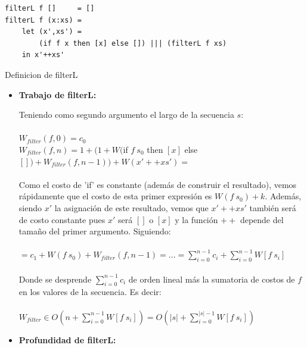 \documentclass[12pt]{article}
\begin{document}
\begin{table}[h]
\begin{lstlisting}
filterL f []     = []
filterL f (x:xs) = 
    let (x',xs') = 
        (if f x then [x] else []) ||| (filterL f xs) 
    in x'++xs'
\end{lstlisting}
\caption{Definicion de filterL}
\end{table}
\begin{itemize}

\item \textbf{Trabajo de filterL:}

Teniendo como segundo argumento el largo de la secuencia $s$: \\
\\
    $W_{filter}(f, 0) = c_0$ \\
    $W_{filter}(f, n) = 1 + ( 1 + W($if $f\ s_0$ then $[x]$ else $[]) + W_{filter}(f, n-1) ) + W(x'++xs') = $ \\
\\
    Como el costo de 'if' es constante (además de construir el resultado), vemos rápidamente que el costo de esta primer expresión es $W(f\ s_0) + k$.
    Además, siendo $x'$ la asignación de este resultado, vemos que $x'++xs'$ también será de costo constante pues $x'$ será $[]$ o $[x]$ y la función $++$ depende del tamaño del primer argumento. Siguiendo:\\
\\
    $ = c_1 + W(f\ s_0) + W_{filter}(f, n-1) = ... = \sum\limits_{i=0}^{n-1} c_i + \sum\limits_{i=0}^{n-1} W[f\ s_i] $ \\
\\
    Donde se desprende $\sum\limits_{i=0}^{n-1} c_i$ de orden lineal más la sumatoria de costos de $f$ en los valores de la secuencia. Es decir: \\
\\
    $W_{filter} \in O(n + \sum\limits_{i=0}^{n-1} W[f\ s_i] ) = O(|s| + \sum\limits_{i=0}^{|s|-1} W[f\ s_i])$\\

\item \textbf{Profundidad de filterL:}


\end{itemize}
\end{document}
